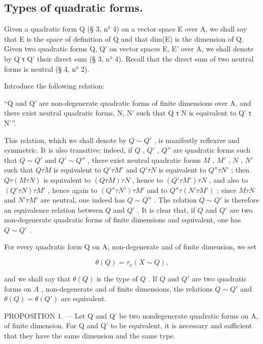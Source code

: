 \subsection{Types of quadratic forms.}

Given a quadratic form Q (§ 3, n° 4) on a vector space E over A, we shall say that E is the space of definition of Q and that dim(E) is the dimension of Q. Given two quadratic forms Q, Q' on vector spaces E, E' over A, we shall denote by Q τ Q' their direct sum (§ 3, n° 4). Recall that the direct sum of two neutral forms is neutral (§ 4, n° 2).

Introduce the following relation:

“Q and Q' are non-degenerate quadratic forms of finite dimensions over A, and there exist neutral quadratic forms, N, N' such that Q τ N is equivalent to Q' τ N'”.

This relation, which we shall denote by \(Q \sim Q'\) , is manifestly reflexive and symmetric. It is also transitive: indeed, if \(Q\) , \(Q'\) , \(Q''\) are quadratic forms such that \(Q \sim Q'\) and \(Q' \sim Q''\) , there exist neutral quadratic forms \(M\) , \(M'\) , \(N\) , \(N'\) such that \(Q \tau M\) is equivalent to \(Q' \tau M'\) and \(Q' \tau N\) is equivalent to \(Q'' \tau N'\) ; then \(Q \tau (M \tau N)\) is equivalent to \((Q \tau M) \tau N\) , hence to \((Q' \tau M') \tau N\) , and also to \((Q' \tau N) \tau M'\) , hence again to \((Q'' \tau N') \tau M'\) and to \(Q'' \tau (N' \tau M')\) ; since \(M \tau N\) and \(N' \tau M'\) are neutral, one indeed has \(Q \sim Q''\) . The relation \(Q \sim Q'\) is therefore an equivalence relation between \(Q\) and \(Q'\) . It is clear that, if \(Q\) and \(Q'\) are two non-degenerate quadratic forms of finite dimensions and equivalent, one has \(Q \sim Q'\) .

For every quadratic form Q on A, non-degenerate and of finite dimension, we set

\[
\theta (Q) = \tau_ {x} (X \sim Q),\tag{1}
\]

and we shall say that \(\theta(Q)\) is the type of \(Q\) . If \(Q\) and \(Q'\) are two quadratic forms on \(A\) , non-degenerate and of finite dimensions, the relations \(Q \sim Q'\) and \(\theta(Q) = \theta(Q')\) are equivalent.

PROPOSITION 1. --- Let Q and Q' be two nondegenerate quadratic forms on A, of finite dimension. For Q and Q' to be equivalent, it is necessary and sufficient that they have the same dimension and the same type.

